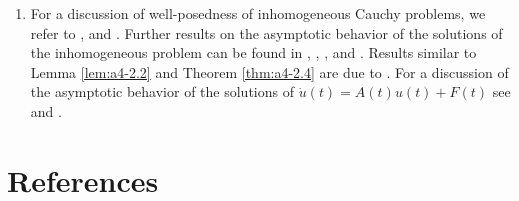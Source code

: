 \begin{enumerate}[label=\emph{Section \arabic*:}, wide, itemsep=1ex]
\item For a discussion of well-posedness of inhomogeneous Cauchy problems, we refer to \citet[p.83]{goldstein:1985a}, and \citet[p.105]{pazy:1983}. 
Further results on the asymptotic behavior of the solutions of the inhomogeneous problem can be found in \citet{raohengartner:1974}, \citet{zaidman:1979}, \citet{pazy:1983}, and \citet{neubrander:1985b}. 
Results similar to Lemma \ref{lem:a4-2.2} and Theorem \ref{thm:a4-2.4} are due to \citet{pruess:1984}. 
For a discussion of the asymptotic behavior of the solutions of $\dot{u}(t) = A(t)u(t) + F(t)$ see \citet{datko:1972} and \citet[p.172]{pazy:1983}.

\end{enumerate}

\section*{References}
{\RaggedRight
\renewcommand{\bibsection}{}

}